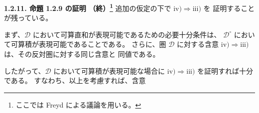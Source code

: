 \medskip
\noindent\textbf{1.2.11. 命題 1.2.9 の証明
（終）\footnote{ここでは Freyd による議論を用いる。}}\quad
追加の仮定の下で $\mathrm{iv)}\Longrightarrow\mathrm{iii)}$ を
証明することが残っている。

まず、$\mathcal D$ において可算直和が表現可能であるための必要十分条件は、
$\mathcal D^\circ$ において可算積が表現可能であることである。
さらに、圏 $\mathcal D$ に対する含意
$\mathrm{iv)}\Longrightarrow\mathrm{iii)}$ は、その反対圏に対する同じ含意と
同値である。

したがって、$\mathcal D$ において可算積が表現可能な場合に
$\mathrm{iv)}\Longrightarrow\mathrm{iii)}$ を証明すれば十分である。
すなわち、以上を考慮すれば、含意
\endgroup
